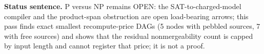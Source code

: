 \documentclass[11pt]{article}
\begin{document}
\bigskip
\noindent\textbf{Status sentence.} P versus NP remains OPEN: the SAT-to-charged-model compiler and the product-span obstruction are open load-bearing arrows; this pass finds exact smallest recompute-price DAGs (5 nodes with pebbled sources, 7 with free sources) and shows that the residual nonmergeability count is capped by input length and cannot register that price; it is not a proof.
\end{document}
